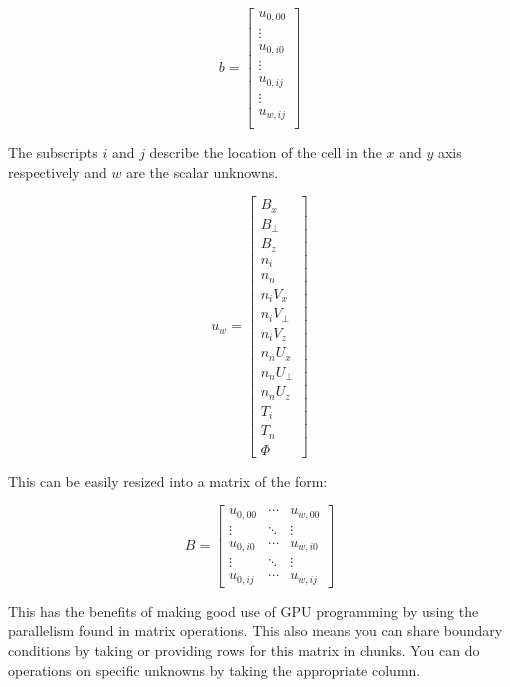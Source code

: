 \documentclass[12pt,upcase]{umlthesis}
\begin{document}
\begin{equation}
	b =
\begin{bmatrix}
	u_{0,00} \\
	\vdots \\
	u_{0,i0} \\
	\vdots \\
	u_{0,ij} \\
	\vdots \\
	u_{w,ij} \\
\end{bmatrix}
\end{equation}

The subscripts $i$ and $j$ describe the location of the cell in the $x$ and $y$ axis respectively and $w$ are the scalar unknowns.

\begin{equation}
	u_w = 
	\begin{bmatrix}
		B_x \\
		B_{\perp} \\
		B_z \\
		n_i \\
		n_n \\
		n_i V_x \\
		n_i V_{\perp} \\
		n_i V_z \\
		n_n U_x \\
		n_n U_{\perp} \\
		n_n U_z \\
		T_i \\
		T_n \\
		\Phi
	\end{bmatrix}
\end{equation}

This can be easily resized into a matrix of the form:

\begin{equation}
	B =
	\begin{bmatrix}
		u_{0,00} & \cdots  & u_{w,00} \\
		\vdots   & \ddots & \vdots \\
		u_{0,i0} & \cdots & u_{w,i0} \\
		\vdots   & \ddots & \vdots \\
		u_{0,ij} & \cdots  & u_{w,ij}
	\end{bmatrix}
\end{equation}

This has the benefits of making good use of GPU programming by using the parallelism found in matrix operations. This also means you can share boundary conditions by taking or providing rows for this matrix in chunks. You can do operations on specific unknowns by taking the appropriate column.
\end{document}
